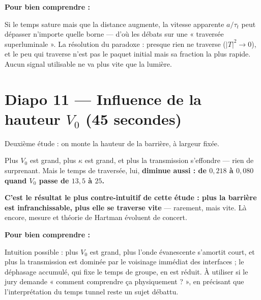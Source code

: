 \documentclass[11pt,a4paper]{article}
\newcommand{\diapo}[2]{\section*{Diapo #1 --- #2}}
\newenvironment{comprendre}%
  {\par\medskip\noindent\hrulefill\par\nopagebreak\textbf{Pour bien comprendre :}\itshape\par}%
  {\par\nopagebreak\noindent\hrulefill\par\medskip}
\begin{document}
\begin{comprendre}
Si le temps sature mais que la distance augmente, la vitesse apparente $a/\tau_t$
peut dépasser n'importe quelle borne --- d'où les débats sur une « traversée
superluminale ». La résolution du paradoxe : presque rien ne traverse
($|T|^2 \to 0$), et le peu qui traverse n'est pas le paquet initial mais sa
fraction la plus rapide. Aucun signal utilisable ne va plus vite que la lumière.
\end{comprendre}

\diapo{11}{Influence de la hauteur $V_0$ (45 secondes)}

Deuxième étude : on monte la hauteur de la barrière, à largeur fixée.

Plus $V_0$ est grand, plus $\kappa$ est grand, et plus la transmission
s'effondre --- rien de surprenant. Mais le temps de traversée, lui,
\textbf{diminue aussi : de $0{,}218$ à $0{,}080$ quand $V_0$ passe de $13{,}5$ à
$25$.}

\textbf{C'est le résultat le plus contre-intuitif de cette étude : plus la
barrière est infranchissable, plus elle se traverse vite} --- rarement, mais
vite. Là encore, mesure et théorie de Hartman évoluent de concert.

\begin{comprendre}
Intuition possible : plus $V_0$ est grand, plus l'onde évanescente s'amortit
court, et plus la transmission est dominée par le voisinage immédiat des
interfaces ; le déphasage accumulé, qui fixe le temps de groupe, en est réduit.
À utiliser si le jury demande « comment comprendre ça physiquement ? », en
précisant que l'interprétation du temps tunnel reste un sujet débattu.
\end{comprendre}

\end{document}
